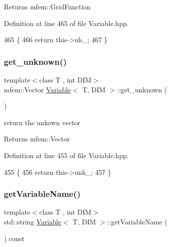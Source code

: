 \begin{DoxyReturn}{Returns}
mfem\+::\+Grid\+Function 
\end{DoxyReturn}


Definition at line 465 of file Variable.\+hpp.


\begin{DoxyCode}
465                                                 \{
466   \textcolor{keywordflow}{return} this->uh\_;
467 \}
\end{DoxyCode}
\mbox{\label{classVariable_acf251fb024a0fd8fab0ca0b28df79c12}} 
\subsubsection{\texorpdfstring{get\+\_\+unknown()}{get\_unknown()}}
{\footnotesize\ttfamily template$<$class T , int D\+IM$>$ \\
mfem\+::\+Vector \hyperlink{classVariable}{Variable}$<$ T, D\+IM $>$\+::get\+\_\+unknown (\begin{DoxyParamCaption}{ }\end{DoxyParamCaption})}



return the unkown vector 

\begin{DoxyReturn}{Returns}
mfem\+::\+Vector 
\end{DoxyReturn}


Definition at line 455 of file Variable.\+hpp.


\begin{DoxyCode}
455                                          \{
456   \textcolor{keywordflow}{return} this->unk\_;
457 \}
\end{DoxyCode}
\mbox{\label{classVariable_a32906242d5d4354c2b1b6cfd852d7c2c}} 
\subsubsection{\texorpdfstring{get\+Variable\+Name()}{getVariableName()}}
{\footnotesize\ttfamily template$<$class T , int D\+IM$>$ \\
std\+::string \hyperlink{classVariable}{Variable}$<$ T, D\+IM $>$\+::get\+Variable\+Name (\begin{DoxyParamCaption}{ }\end{DoxyParamCaption}) const}



